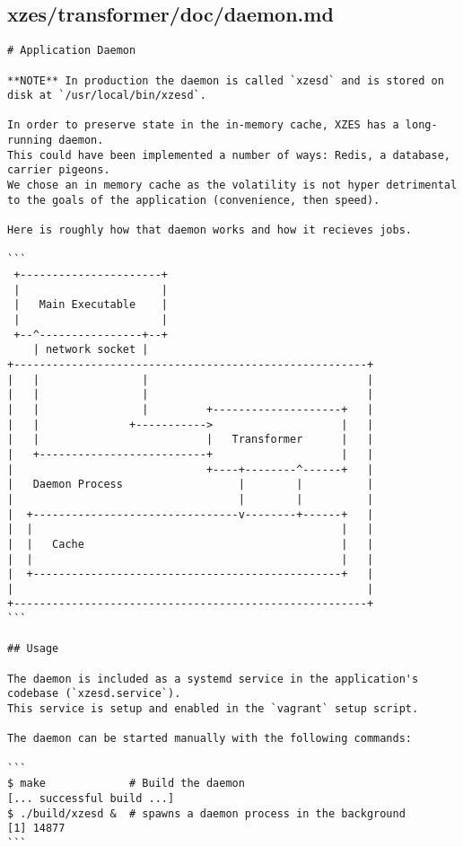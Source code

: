 \subsection{xzes/transformer/doc/daemon.md}
\begin{lstlisting}
# Application Daemon

**NOTE** In production the daemon is called `xzesd` and is stored on disk at `/usr/local/bin/xzesd`.

In order to preserve state in the in-memory cache, XZES has a long-running daemon.
This could have been implemented a number of ways: Redis, a database, carrier pigeons.
We chose an in memory cache as the volatility is not hyper detrimental to the goals of the application (convenience, then speed).

Here is roughly how that daemon works and how it recieves jobs.

```
 +----------------------+
 |                      |
 |   Main Executable    |
 |                      |
 +--^----------------+--+
    | network socket |
+-------------------------------------------------------+
|   |                |                                  |
|   |                |                                  |
|   |                |         +--------------------+   |
|   |              +----------->                    |   |
|   |                          |   Transformer      |   |
|   +--------------------------+                    |   |
|                              +----+--------^------+   |
|   Daemon Process                  |        |          |
|                                   |        |          |
|  +--------------------------------v--------+------+   |
|  |                                                |   |
|  |   Cache                                        |   |
|  |                                                |   |
|  +------------------------------------------------+   |
|                                                       |
+-------------------------------------------------------+
```

## Usage

The daemon is included as a systemd service in the application's codebase (`xzesd.service`).
This service is setup and enabled in the `vagrant` setup script.

The daemon can be started manually with the following commands:

```
$ make             # Build the daemon
[... successful build ...]
$ ./build/xzesd &  # spawns a daemon process in the background
[1] 14877
```


\end{lstlisting}
